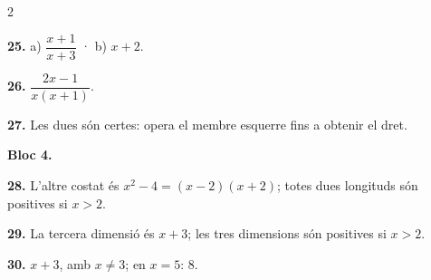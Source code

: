 \documentclass[13pt,a4paper]{extarticle}
\begin{document}
\begin{multicols}{2}
\begin{minipage}{\linewidth}
\end{minipage}\par\vspace{1.6mm}
\par\noindent\begin{minipage}{\linewidth}
\textbf{25.} a) $\dfrac{x+1}{x+3}$ · b) $x+2$.\par
\end{minipage}\par\vspace{1.6mm}
\par\noindent\begin{minipage}{\linewidth}
\textbf{26.} $\dfrac{2x-1}{x(x+1)}$.\par
\end{minipage}\par\vspace{1.6mm}
\par\noindent\begin{minipage}{\linewidth}
\textbf{27.} Les dues són certes: opera el membre esquerre fins a obtenir el dret.\par
\end{minipage}\par\vspace{1.6mm}
\textbf{Bloc 4.}\par
\par\noindent\begin{minipage}{\linewidth}
\textbf{28.} L'altre costat és $x^2-4=(x-2)(x+2)$; totes dues longituds són positives si $x>2$.\par
\end{minipage}\par\vspace{1.6mm}
\par\noindent\begin{minipage}{\linewidth}
\textbf{29.} La tercera dimensió és $x+3$; les tres dimensions són positives si $x>2$.\par
\end{minipage}\par\vspace{1.6mm}
\par\noindent\begin{minipage}{\linewidth}
\textbf{30.} $x+3$, amb $x\neq3$; en $x=5$: $8$.\par
\end{minipage}\par\vspace{1.6mm}
\par\noindent\begin{minipage}{\linewidth}

\end{minipage}
\end{multicols}
\end{document}
